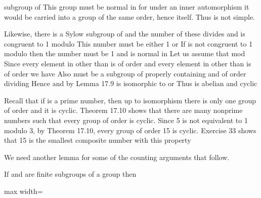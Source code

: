 \documentclass[11pt,oneside]{article}
\begin{document}
\BookNarrativetrue

\begin{BookBody}

\noindent {}subgroup  of  This group  must be normal in  for under an inner automorphism it would be carried into a group of the same order, hence itself. Thus  is not simple.

Likewise, there is a Sylow subgroup  of  and the number of these divides  and is congruent to 1 modulo  This number must be either 1 or  If  is not congruent to 1 modulo  then the number must be 1 and  is normal in  Let us assume that mod  Since every element in  other than  is of order  and every element in  other than  is of order  we have  Also  must be a subgroup of  properly containing  and of order dividing  Hence  and by Lemma 17.9 is isomorphic to  or  Thus  is abelian and cyclic\BookEnd{\blacklozenge}

 Recall that if  is a prime number, then up to isomorphism there is only one group of order  and it is cyclic. Theorem 17.10 shows that there are many nonprime numbers  such that every group of order  is cyclic. Since 5 is not equivalent to 1 modulo 3, by Theorem 17.10, every group of order 15 is cyclic. Exercise 33 shows that 15 is the smallest composite number with this property\BookEnd{\blacktriangle}

We need another lemma for some of the counting arguments that follow.

 If  and  are finite subgroups of a group  then

\begin{center}\begin{adjustbox}{max width=\linewidth}\end{adjustbox}\end{center}


\end{BookBody}
\end{document}
